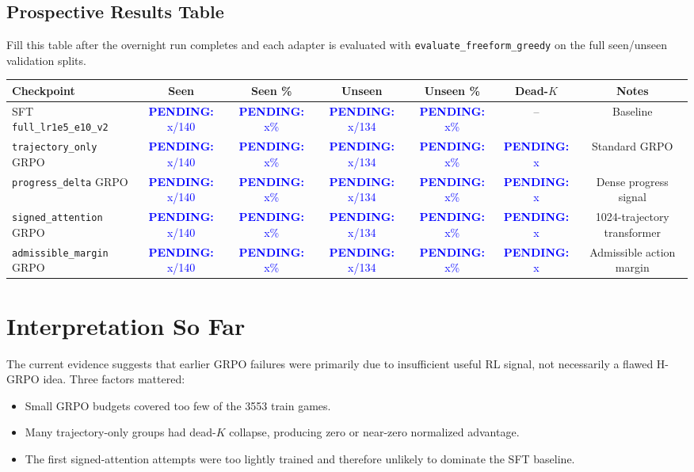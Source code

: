 \documentclass[10pt]{article}
\newcommand{\method}[1]{\texttt{#1}}
\newcommand{\pending}[1]{\textcolor{blue}{\textbf{PENDING:} #1}}
\begin{document}
\subsection{Prospective Results Table}
Fill this table after the overnight run completes and each adapter is evaluated with \texttt{evaluate\_freeform\_greedy} on the full seen/unseen validation splits.
\begin{center}
\begin{tabular}{lcccccc}
\toprule
Checkpoint & Seen & Seen \% & Unseen & Unseen \% & Dead-\(K\) & Notes \\
\midrule
SFT \method{full\_lr1e5\_e10\_v2} & \pending{x/140} & \pending{x\%} & \pending{x/134} & \pending{x\%} & -- & Baseline \\
\method{trajectory\_only} GRPO & \pending{x/140} & \pending{x\%} & \pending{x/134} & \pending{x\%} & \pending{x} & Standard GRPO \\
\method{progress\_delta} GRPO & \pending{x/140} & \pending{x\%} & \pending{x/134} & \pending{x\%} & \pending{x} & Dense progress signal \\
\method{signed\_attention} GRPO & \pending{x/140} & \pending{x\%} & \pending{x/134} & \pending{x\%} & \pending{x} & 1024-trajectory transformer \\
\method{admissible\_margin} GRPO & \pending{x/140} & \pending{x\%} & \pending{x/134} & \pending{x\%} & \pending{x} & Admissible action margin \\
\bottomrule
\end{tabular}
\end{center}

\section{Interpretation So Far}
The current evidence suggests that earlier GRPO failures were primarily due to insufficient useful RL signal, not necessarily a flawed H-GRPO idea. Three factors mattered:
\begin{itemize}
    \item Small GRPO budgets covered too few of the 3553 train games.
    \item Many trajectory-only groups had dead-\(K\) collapse, producing zero or near-zero normalized advantage.
    \item The first signed-attention attempts were too lightly trained and therefore unlikely to dominate the SFT baseline.
\end{itemize}
\end{document}
